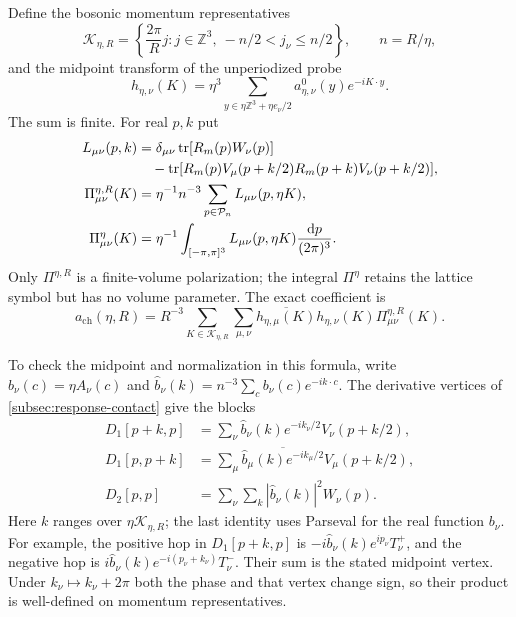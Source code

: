 \documentclass[11pt,letterpaper,reqno]{amsart}
\newcommand{\Z}{\mathbb Z}
\newcommand{\dd}{\mathrm d}
\DeclareMathOperator{\tr}{tr}
\begin{document}
Define the bosonic momentum representatives
\[
 \mathcal K_{\eta,R}=
 \left\{\frac{2\pi}{R}j:j\in\Z^3,\ -n/2<j_\nu\le n/2\right\},
                   \qquad n=R/\eta,
\]
and the midpoint transform of the unperiodized probe
\begin{equation}\label{eq:response-midpoint-transform}
 h_{\eta,\nu}(K)=\eta^3
       \sum_{y\in\eta\Z^3+\eta e_\nu/2}
                     a_{\eta,\nu}^0(y)e^{-iK\cdot y}.
\end{equation}
The sum is finite. For real $p,k$ put
\begin{align}
 L_{\mu\nu}(p,k)
  &=\delta_{\mu\nu}\tr[R_m(p)W_\nu(p)]\notag\\
  &\quad-\tr[R_m(p)V_\mu(p+k/2)
                     R_m(p+k)V_\nu(p+k/2)],\label{eq:response-polarization-integrand}\\
 \Pi^{\eta,R}_{\mu\nu}(K)
  &=\eta^{-1}n^{-3}\sum_{p\in\mathcal P_n}
                       L_{\mu\nu}(p,\eta K),\notag\\
 \Pi^\eta_{\mu\nu}(K)
  &=\eta^{-1}\int_{[-\pi,\pi]^3}
          L_{\mu\nu}(p,\eta K)\frac{\dd p}{(2\pi)^3}.
                                  \label{eq:response-polarization-kernels}
\end{align}
Only $\Pi^{\eta,R}$ is a finite-volume polarization; the integral
$\Pi^\eta$ retains the lattice symbol but has no volume parameter.
The exact coefficient is
\begin{equation}\label{eq:response-polarization-identity}
 a_{\mathrm{ch}}(\eta,R)
    =R^{-3}\sum_{K\in\mathcal K_{\eta,R}}\sum_{\mu,\nu}
       \overline{h_{\eta,\mu}(K)}h_{\eta,\nu}(K)
                                      \Pi^{\eta,R}_{\mu\nu}(K).
\end{equation}

To check the midpoint and normalization in this formula, write
$b_\nu(c)=\eta A_\nu(c)$ and
$\widehat b_\nu(k)=n^{-3}\sum_cb_\nu(c)e^{-ik\cdot c}$.
The derivative vertices of \cref{subsec:response-contact}
give the blocks
\begin{align*}
 D_1[p+k,p]&=\sum_\nu\widehat b_\nu(k)e^{-ik_\nu/2}
                                          V_\nu(p+k/2),\\
 D_1[p,p+k]&=\sum_\mu
         \overline{\widehat b_\mu(k)e^{-ik_\mu/2}}
                                          V_\mu(p+k/2),\\
 D_2[p,p]&=\sum_\nu\sum_k|\widehat b_\nu(k)|^2W_\nu(p).
\end{align*}
Here $k$ ranges over $\eta\mathcal K_{\eta,R}$; the last
identity uses Parseval for the real function $b_\nu$.
For example, the positive hop in $D_1[p+k,p]$ is
$-i\widehat b_\nu(k)e^{ip_\nu}T_\nu^+$, and the negative hop
is $i\widehat b_\nu(k)e^{-i(p_\nu+k_\nu)}T_\nu^-$.
Their sum is the stated midpoint vertex. Under $k_\nu\mapsto
k_\nu+2\pi$ both the phase and that vertex change sign, so
their product is well-defined on momentum representatives.
\end{document}
